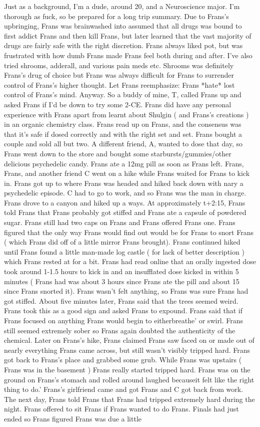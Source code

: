 \documentclass[12pt]{book}
\begin{document}
Just as a background, I'm a dude, around 20, and a Neuroscience major. I'm thorough as fuck, so be prepared for a long trip summary. Due to Frans's upbringing, Frans was brainwashed into assumed that all drugs was bound to first addict Frans and then kill Frans, but later learned that the vast majority of drugs are fairly safe with the right discretion. Frans always liked pot, but was frustrated with how dumb Frans made Frans feel both during and after. I've also tried shrooms, adderall, and various pain meds etc. Shrooms was definitely Frans's drug of choice but Frans was always difficult for Frans to surrender control of Frans's higher thought. Let Frans reemphasize: Frans *hate* lost control of Frans's mind. Anyway. So a buddy of mine, T, called Frans up and asked Frans if I'd be down to try some 2-CE. Frans did have any personal experience with Frans apart from learnt about Shulgin ( and Frans's creations ) in an organic chemistry class. Frans read up on Frans, and the consensus was that it's safe if dosed correctly and with the right set and set. Frans bought a couple and sold all but two. A different friend, A, wanted to dose that day, so Frans went down to the store and bought some starbursts/gummies/other delicious psychedelic candy. Frans ate a 12mg pill as soon as Frans left. Frans, Frans, and another friend C went on a hike while Frans waited for Frans to kick in. Frans got up to where Frans was headed and hiked back down with nary a psychedelic episode. C had to go to work, and so Frans was the man in charge. Frans drove to a canyon and hiked up a ways. At approximately t+2:15, Frans told Frans that Frans probably got stiffed and Frans ate a capsule of powdered sugar. Frans still had two caps on Frans and Frans offered Frans one. Frans figured that the only way Frans would find out would be for Frans to snort Frans ( which Frans did off of a little mirror Frans brought). Frans continued hiked until Frans found a little man-made log castle ( for lack of better description ) which Frans rested at for a bit. Frans had read online that an orally ingested dose took around 1-1.5 hours to kick in and an insufflated dose kicked in within 5 minutes ( Frans had was about 3 hours since Frans ate the pill and about 15 since Frans snorted it). Frans wasn't felt anything, so Frans was sure Frans had got stiffed. About five minutes later, Frans said that the trees seemed weird. Frans took this as a good sign and asked Frans to expound. Frans said that if Frans focused on anything Frans would begin to eitherbreathe' or swirl. Frans still seemed extremely sober so Frans again doubted the authenticity of the chemical. Later on Frans's hike, Frans claimed Frans saw faced on or made out of nearly everything Frans came across, but still wasn't visibly tripped hard. Frans got back to Frans's place and grabbed some grub. While Frans was upstairs ( Frans was in the basement ) Frans really started tripped hard. Frans was on the ground on Frans's stomach and rolled around laughed becauseit felt like the right thing to do.' Frans's girlfriend came and got Frans and C got back from work. The next day, Frans told Frans that Frans had tripped extremely hard during the night. Frans offered to sit Frans if Frans wanted to do Frans. Finals had just ended so Frans figured Frans was due a little 
\end{document}
